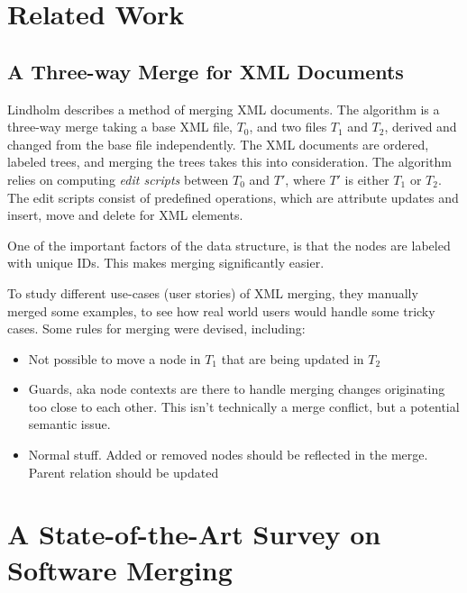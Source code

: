 \documentclass[a4paper,english]{ifimaster}
\begin{document}
\section{Related Work}%
\label{sec:related_work}

\subsection{A Three-way Merge for XML Documents}%
\label{sub:_a_three_way_merge_for_xml_documents}

Lindholm describes a method of merging XML documents. The algorithm is a three-way merge taking a base XML file, $T_0$, and two files $T_1$ and $T_2$, derived and changed from the base file independently. The XML documents are ordered, labeled trees, and merging the trees takes this into consideration. The algorithm relies on computing \textit{edit scripts} between $T_0$ and $T'$, where $T'$ is either $T_1$ or $T_2$. The edit scripts consist of predefined operations, which are attribute updates and insert, move and delete for XML elements.

One of the important factors of the data structure, is that the nodes are labeled with unique IDs. This makes merging significantly easier.

To study different use-cases (user stories) of XML merging, they manually merged some examples, to see how real world users would handle some tricky cases. Some rules for merging were devised, including:

\begin{itemize}
	\item Not possible to move a node in $T_1$ that are being updated in $T_2$
	\item Guards, aka node contexts are there to handle merging changes originating too close to each other. This isn't technically a merge conflict, but a potential semantic issue.
	\item Normal stuff. Added or removed nodes should be reflected in the merge. Parent relation should be updated
\end{itemize}


\section{A State-of-the-Art Survey on Software Merging}%
\label{sec:a_state_of_the_art_survey_on_software_merging}
\end{document}
